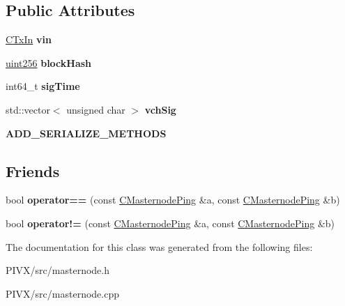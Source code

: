 \subsection*{Public Attributes}
\begin{DoxyCompactItemize}
\item 
\mbox{\label{class_c_masternode_ping_a571b8eea88a8e3a0875780e1652db23a}} 
\mbox{\hyperlink{class_c_tx_in}{C\+Tx\+In}} {\bfseries vin}
\item 
\mbox{\label{class_c_masternode_ping_a79701d12b8043278f5054ac2bbdc1634}} 
\mbox{\hyperlink{classuint256}{uint256}} {\bfseries block\+Hash}
\item 
\mbox{\label{class_c_masternode_ping_a6f34bac31f77da61a9584a09b3af7b9e}} 
int64\+\_\+t {\bfseries sig\+Time}
\item 
\mbox{\label{class_c_masternode_ping_a37901b2eeef5ee740e55f3c038b35a15}} 
std\+::vector$<$ unsigned char $>$ {\bfseries vch\+Sig}
\item 
\mbox{\label{class_c_masternode_ping_acc0c4885f3e128b03d5638b077dbd864}} 
{\bfseries A\+D\+D\+\_\+\+S\+E\+R\+I\+A\+L\+I\+Z\+E\+\_\+\+M\+E\+T\+H\+O\+DS}
\end{DoxyCompactItemize}
\subsection*{Friends}
\begin{DoxyCompactItemize}
\item 
\mbox{\label{class_c_masternode_ping_aabbc8547aea2e228bf850e91ddaa8cc9}} 
bool {\bfseries operator==} (const \mbox{\hyperlink{class_c_masternode_ping}{C\+Masternode\+Ping}} \&a, const \mbox{\hyperlink{class_c_masternode_ping}{C\+Masternode\+Ping}} \&b)
\item 
\mbox{\label{class_c_masternode_ping_ad2ecef1cf1f957d3002842b396652028}} 
bool {\bfseries operator!=} (const \mbox{\hyperlink{class_c_masternode_ping}{C\+Masternode\+Ping}} \&a, const \mbox{\hyperlink{class_c_masternode_ping}{C\+Masternode\+Ping}} \&b)
\end{DoxyCompactItemize}


The documentation for this class was generated from the following files\+:\begin{DoxyCompactItemize}
\item 
P\+I\+V\+X/src/masternode.\+h\item 
P\+I\+V\+X/src/masternode.\+cpp\end{DoxyCompactItemize}
